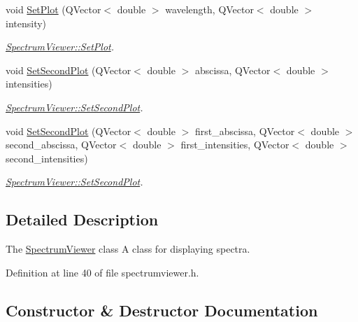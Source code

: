 \begin{DoxyCompactItemize}
\item 
void \hyperlink{class_spectrum_viewer_aec1ee2ca153eba1a3fd38af1c9ae0dc6}{Set\+Plot} (Q\+Vector$<$ double $>$ wavelength, Q\+Vector$<$ double $>$ intensity)
\begin{DoxyCompactList}\small\item\em \hyperlink{class_spectrum_viewer_aec1ee2ca153eba1a3fd38af1c9ae0dc6}{Spectrum\+Viewer\+::\+Set\+Plot}. \end{DoxyCompactList}\item 
void \hyperlink{class_spectrum_viewer_a0741973183e8cbefaff7264eba320521}{Set\+Second\+Plot} (Q\+Vector$<$ double $>$ abscissa, Q\+Vector$<$ double $>$ intensities)
\begin{DoxyCompactList}\small\item\em \hyperlink{class_spectrum_viewer_a0741973183e8cbefaff7264eba320521}{Spectrum\+Viewer\+::\+Set\+Second\+Plot}. \end{DoxyCompactList}\item 
void \hyperlink{class_spectrum_viewer_a95fcf356e6842b634d6a3229a487b364}{Set\+Second\+Plot} (Q\+Vector$<$ double $>$ first\+\_\+abscissa, Q\+Vector$<$ double $>$ second\+\_\+abscissa, Q\+Vector$<$ double $>$ first\+\_\+intensities, Q\+Vector$<$ double $>$ second\+\_\+intensities)
\begin{DoxyCompactList}\small\item\em \hyperlink{class_spectrum_viewer_a0741973183e8cbefaff7264eba320521}{Spectrum\+Viewer\+::\+Set\+Second\+Plot}. \end{DoxyCompactList}\end{DoxyCompactItemize}


\subsection{Detailed Description}
The \hyperlink{class_spectrum_viewer}{Spectrum\+Viewer} class A class for displaying spectra. 

Definition at line 40 of file spectrumviewer.\+h.



\subsection{Constructor \& Destructor Documentation}
